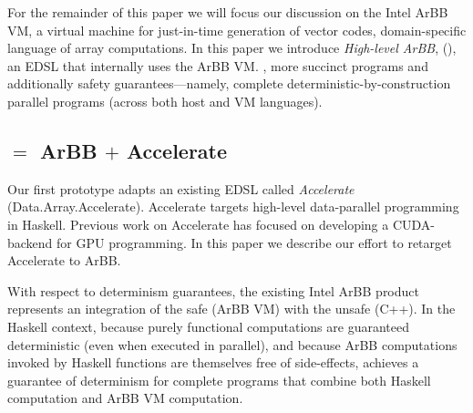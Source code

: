 {For the remainder of this paper we will focus our discussion
  on the Intel ArBB VM, a virtual machine for just-in-time
  generation of vector codes,  domain-specific
  language of array computations.  In this paper we introduce
  {\em High-level ArBB}, 
  (\systemname{}), an EDSL that internally uses the ArBB
  VM.  ,
\systemname{} 
  more succinct programs and additionally safety
  guarantees---namely, complete deterministic-by-construction parallel
  programs (across both host and VM languages).}


\subsection{\accarbb{} $=$ ArBB $+$ Accelerate}
\label{sec:accelerate-arbb}

Our first \systemname{} prototype adapts an existing EDSL called {\em
  Accelerate} (Data.Array.Accelerate).  Accelerate targets high-level
data-parallel programming in Haskell.
Previous work on Accelerate has focused on developing a CUDA-backend
for GPU programming.  In this paper we describe our effort to retarget
Accelerate to ArBB.  

With respect to determinism guarantees, the existing Intel ArBB product
represents an integration of the safe (ArBB VM) with the unsafe (C++).
In the Haskell context, because purely functional computations are
guaranteed deterministic (even when executed in parallel), and because
ArBB computations invoked by Haskell functions are themselves free of
side-effects, \systemname{} achieves a
guarantee of determinism for complete programs that combine both
Haskell computation and ArBB VM computation.


